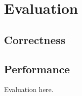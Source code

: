 
\chapter{\label{chap:evaluation}Evaluation}

\section{Correctness}

\section{Performance}

Evaluation here.
